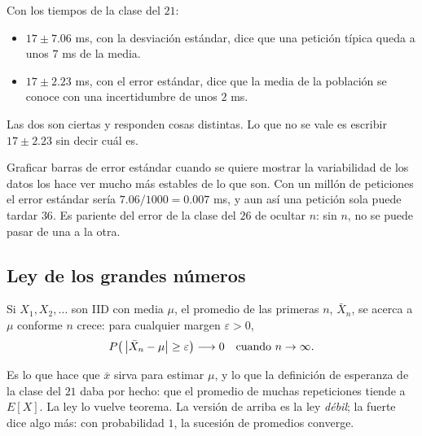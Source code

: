 \documentclass[11pt,letterpaper]{article}
\begin{document}
\begin{ejemplo}
    Con los tiempos de la clase del $21$:
    \begin{itemize}[itemsep=0.2em]
        \item $17 \pm 7.06$ ms, con la desviación estándar, dice que
              una petición típica queda a unos $7$ ms de la media.
        \item $17 \pm 2.23$ ms, con el error estándar, dice que la
              media de la población se conoce con una incertidumbre de
              unos $2$ ms.
    \end{itemize}
    Las dos son ciertas y responden cosas distintas. Lo que no se
    vale es escribir $17 \pm 2.23$ sin decir cuál es.
\end{ejemplo}

\begin{ojo}
    Graficar barras de error estándar cuando se quiere mostrar la
    variabilidad de los datos los hace ver mucho más estables de lo que
    son. Con un millón de peticiones el error estándar sería
    $7.06 / 1000 = 0.007$ ms, y aun así una petición sola puede tardar
    $36$. Es pariente del error de la clase del $26$ de ocultar $n$:
    sin $n$, no se puede pasar de una a la otra.
\end{ojo}


\subsection*{Ley de los grandes números}

\begin{teorema}
    Si $X_1, X_2, \ldots$ son IID con media $\mu$, el promedio de las
    primeras $n$, $\bar{X}_n$, se acerca a $\mu$ conforme $n$ crece:
    para cualquier margen $\varepsilon > 0$,
    \[
        P\big( \left\lvert \bar{X}_n - \mu \right\rvert \ge \varepsilon \big)
        \longrightarrow 0
        \quad \text{cuando } n \to \infty .
    \]
\end{teorema}

Es lo que hace que $\bar{x}$ sirva para estimar $\mu$, y lo que la
definición de esperanza de la clase del $21$ daba por hecho: que el
promedio de muchas repeticiones tiende a $E[X]$. La ley lo vuelve
teorema. La versión de arriba es la ley \emph{débil}; la fuerte dice
algo más: con probabilidad $1$, la sucesión de promedios converge.
\end{document}
